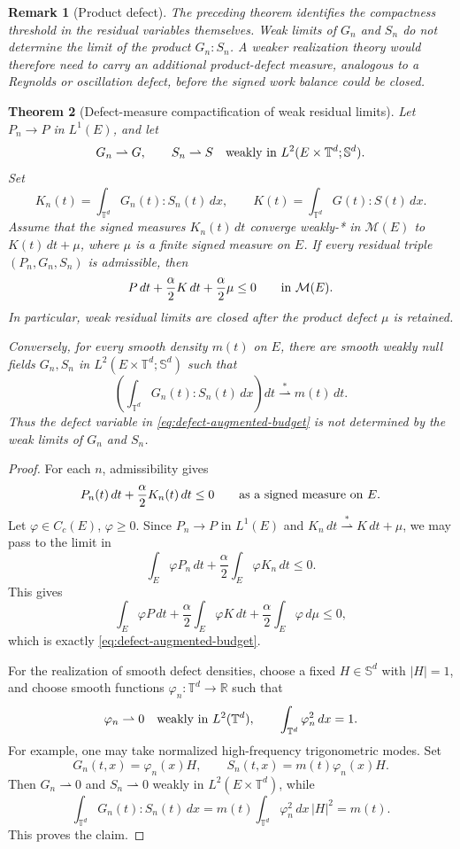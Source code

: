 \documentclass[11pt]{article}
\numberwithin{equation}{section}
\newtheorem{theorem}{Theorem}[section]
\newtheorem{remark}[theorem]{Remark}
\newcommand{\T}{\mathbb T}
\newcommand{\Sym}{\mathbb S}
\begin{document}
\begin{remark}[Product defect]
The preceding theorem identifies the compactness threshold in the residual
variables themselves.  Weak limits of \(G_n\) and \(S_n\) do not determine the
limit of the product \(G_n:S_n\).  A weaker realization theory would therefore
need to carry an additional product-defect measure, analogous to a Reynolds or
oscillation defect, before the signed work balance could be closed.
\end{remark}

\begin{theorem}[Defect-measure compactification of weak residual limits]
\label{thm:defect-compactification}
Let \(P_n\to P\) in \(L^1(E)\), and let
\[
  G_n\rightharpoonup G,\qquad S_n\rightharpoonup S
  \quad\hbox{weakly in }L^2(E\times\T^d;\Sym^d).
\]
Set
\[
  K_n(t)=\int_{\T^d}G_n(t):S_n(t)\,dx,
  \qquad
  K(t)=\int_{\T^d}G(t):S(t)\,dx .
\]
Assume that the signed measures \(K_n(t)\,dt\) converge weakly-* in
\(\mathcal M(E)\) to \(K(t)\,dt+\mu\), where \(\mu\) is a finite signed measure
on \(E\).  If every residual triple \((P_n,G_n,S_n)\) is admissible, then
\begin{equation}
  P\,dt+\frac{\alpha}{2}K\,dt+\frac{\alpha}{2}\mu\le0
  \qquad\hbox{in }\mathcal M(E).
  \label{eq:defect-augmented-budget}
\end{equation}
In particular, weak residual limits are closed after the product defect
\(\mu\) is retained.

Conversely, for every smooth density \(m(t)\) on \(E\), there are smooth
weakly null fields \(G_n,S_n\) in \(L^2(E\times\T^d;\Sym^d)\) such that
\[
  \left(\int_{\T^d}G_n(t):S_n(t)\,dx\right)dt
  \stackrel{*}{\rightharpoonup} m(t)\,dt .
\]
Thus the defect variable in \eqref{eq:defect-augmented-budget} is not
determined by the weak limits of \(G_n\) and \(S_n\).
\end{theorem}

\begin{proof}
For each \(n\), admissibility gives
\[
  P_n(t)\,dt+\frac{\alpha}{2}K_n(t)\,dt\le0
  \qquad\hbox{as a signed measure on }E .
\]
Let \(\varphi\in C_c(E)\), \(\varphi\ge0\).  Since
\(P_n\to P\) in \(L^1(E)\) and \(K_n\,dt\stackrel{*}{\rightharpoonup}K\,dt+\mu\),
we may pass to the limit in
\[
  \int_E\varphi P_n\,dt+\frac{\alpha}{2}\int_E\varphi K_n\,dt\le0 .
\]
This gives
\[
  \int_E\varphi P\,dt
  +\frac{\alpha}{2}\int_E\varphi K\,dt
  +\frac{\alpha}{2}\int_E\varphi\,d\mu\le0 ,
\]
which is exactly \eqref{eq:defect-augmented-budget}.

For the realization of smooth defect densities, choose a fixed
\(H\in\Sym^d\) with \(|H|=1\), and choose smooth functions
\(\varphi_n:\T^d\to\mathbb R\) such that
\[
  \varphi_n\rightharpoonup0\quad\hbox{weakly in }L^2(\T^d),
  \qquad
  \int_{\T^d}\varphi_n^2\,dx=1 .
\]
For example, one may take normalized high-frequency trigonometric modes.  Set
\[
  G_n(t,x)=\varphi_n(x)H,\qquad
  S_n(t,x)=m(t)\varphi_n(x)H .
\]
Then \(G_n\rightharpoonup0\) and \(S_n\rightharpoonup0\) weakly in
\(L^2(E\times\T^d)\), while
\[
  \int_{\T^d}G_n(t):S_n(t)\,dx
  =
  m(t)\int_{\T^d}\varphi_n^2\,dx\, |H|^2
  =
  m(t).
\]
This proves the claim.
\end{proof}
\end{document}
